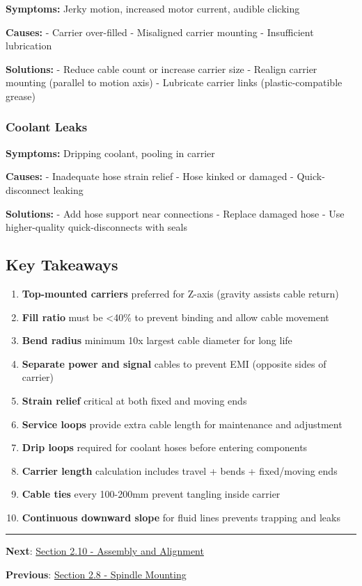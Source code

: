 \documentclass[
]{article}
\providecommand{\tightlist}{%
  \setlength{\itemsep}{0pt}\setlength{\parskip}{0pt}}
\begin{document}
\textbf{Symptoms:} Jerky motion, increased motor current, audible
clicking

\textbf{Causes:} - Carrier over-filled - Misaligned carrier mounting -
Insufficient lubrication

\textbf{Solutions:} - Reduce cable count or increase carrier size -
Realign carrier mounting (parallel to motion axis) - Lubricate carrier
links (plastic-compatible grease)

\subsubsection{Coolant Leaks}\label{coolant-leaks}

\textbf{Symptoms:} Dripping coolant, pooling in carrier

\textbf{Causes:} - Inadequate hose strain relief - Hose kinked or
damaged - Quick-disconnect leaking

\textbf{Solutions:} - Add hose support near connections - Replace
damaged hose - Use higher-quality quick-disconnects with seals

\subsection{Key Takeaways}\label{key-takeaways-5}

\begin{enumerate}
\def\labelenumi{\arabic{enumi}.}
\tightlist
\item
  \textbf{Top-mounted carriers} preferred for Z-axis (gravity assists
  cable return)
\item
  \textbf{Fill ratio} must be \textless40\% to prevent binding and allow
  cable movement
\item
  \textbf{Bend radius} minimum 10x largest cable diameter for long life
\item
  \textbf{Separate power and signal} cables to prevent EMI (opposite
  sides of carrier)
\item
  \textbf{Strain relief} critical at both fixed and moving ends
\item
  \textbf{Service loops} provide extra cable length for maintenance and
  adjustment
\item
  \textbf{Drip loops} required for coolant hoses before entering
  components
\item
  \textbf{Carrier length} calculation includes travel + bends +
  fixed/moving ends
\item
  \textbf{Cable ties} every 100-200mm prevent tangling inside carrier
\item
  \textbf{Continuous downward slope} for fluid lines prevents trapping
  and leaks
\end{enumerate}

\begin{center}\rule{0.5\linewidth}{0.5pt}\end{center}

\textbf{Next}: \href{section-2.10-assembly-alignment.md}{Section 2.10 -
Assembly and Alignment}

\textbf{Previous}: \href{section-2.8-spindle-mounting.md}{Section 2.8 -
Spindle Mounting}
\end{document}
